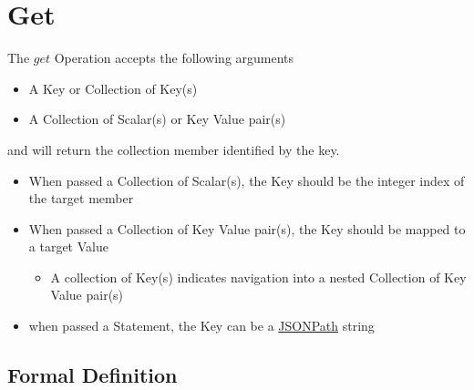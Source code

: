 \documentclass[../../main.tex]{subfiles}
\begin{document}
\section{Get}

The $get$ Operation accepts the following arguments

\begin{itemize}
\item A Key or Collection of Key(s)
\item A Collection of Scalar(s) or Key Value pair(s)
\end{itemize}
and will return the collection member identified by the key.
\begin{itemize}
\item When passed a Collection of Scalar(s), the Key should be the integer index of the target member
\item When passed a Collection of Key Value pair(s), the Key should be mapped to a target Value
  \begin{itemize}
  \item A collection of Key(s) indicates navigation into a nested Collection of Key Value pair(s)
  \end{itemize}
\item when passed a Statement, the Key can be a \href{https://goessner.net/articles/JsonPath/index.html#e2}{JSONPath} string
\end{itemize}

\subsection{Formal Definition}
\end{document}
